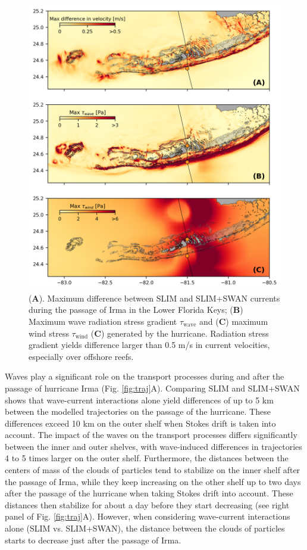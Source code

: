\documentclass[preprint,12pt,authoryear]{elsarticle}
\begin{document}
\begin{figure}
    \centering
    \includegraphics[width=\textwidth]{fig/max_diff_reefs.png}
    \caption{(\textbf{A}). Maximum difference between SLIM and SLIM+SWAN currents during the passage of Irma in the Lower Florida Keys; (\textbf{B}) Maximum wave radiation stress gradient {\boldmath$\tau$}$_\text{wave}$ and (\textbf{C}) maximum wind stress {\boldmath$\tau$}$_\text{wind}$ (\textbf{C}) generated by the hurricane. Radiation stress gradient yields difference larger than 0.5 m/s in current velocities, especially over offshore reefs.}
    \label{fig:diff}
\end{figure}

Waves play a significant role on the transport processes during and after the passage of hurricane Irma (Fig. \ref{fig:traj}A). Comparing SLIM and SLIM+SWAN shows that wave-current interactions alone yield differences of up to 5 km between the modelled trajectories on the passage of the hurricane. These differences exceed 10 km on the outer shelf when Stokes drift is taken into account. The impact of the waves on the transport processes differs significantly between the inner and outer shelves, with wave-induced differences in trajectories 4 to 5 times larger on the outer shelf. Furthermore, the distances between the centers of mass of the clouds of particles tend to stabilize on the inner shelf after the passage of Irma, while they keep increasing on the other shelf up to two days after the passage of the hurricane when taking Stokes drift into account. These distances then stabilize for about a day before they start decreasing (see right panel of Fig. \ref{fig:traj}A). However, when considering wave-current interactions alone (SLIM vs. SLIM+SWAN), the distance between the clouds of particles starts to decrease just after the passage of Irma.
\end{document}
